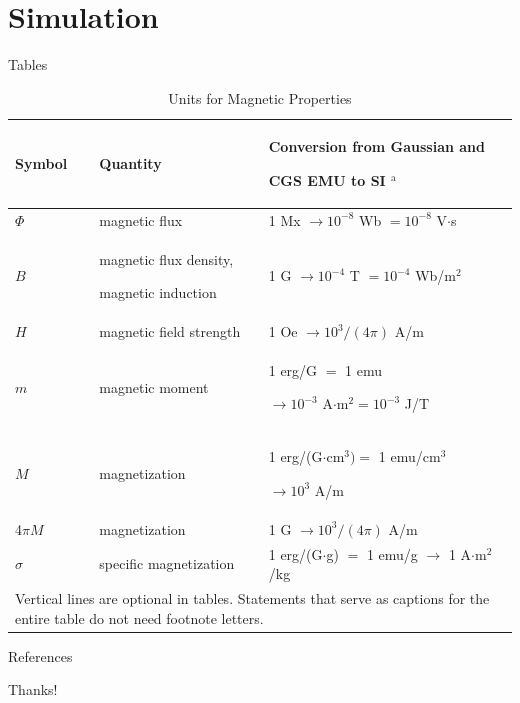 \documentclass[10pt,hyperref={colorlinks,citecolor=blue,urlcolor=peking_blue,linkcolor=}]{beamer}
\theoremstyle{plain}
\begin{document}
\section{Simulation}

\begin{frame}{Tables}
    \begin{table}
        \caption{Units for Magnetic Properties}
        \label{table}
        \setlength{\tabcolsep}{3pt}
        \begin{tabular}{p{40pt}p{100pt}p{140pt}}
        \hline
        Symbol& 
        Quantity& 
        Conversion from Gaussian and \par CGS EMU to SI $^{\mathrm{a}}$ \\
        \hline
        $\Phi $& 
        magnetic flux& 
        1 Mx $\to  10^{-8}$ Wb $= 10^{-8}$ V$\cdot $s \\
        $B$& 
        magnetic flux density, \par magnetic induction& 
        1 G $\to  10^{-4}$ T $= 10^{-4}$ Wb/m$^{2}$ \\
        $H$& 
        magnetic field strength& 
        1 Oe $\to  10^{3}/(4\pi )$ A/m \\
        $m$& 
        magnetic moment& 
        1 erg/G $=$ 1 emu \par $\to 10^{-3}$ A$\cdot $m$^{2} = 10^{-3}$ J/T \\
        $M$& 
        magnetization& 
        1 erg/(G$\cdot $cm$^{3}) =$ 1 emu/cm$^{3}$ \par $\to 10^{3}$ A/m \\
        4$\pi M$& 
        magnetization& 
        1 G $\to  10^{3}/(4\pi )$ A/m \\
        $\sigma $& 
        specific magnetization& 
        1 erg/(G$\cdot $g) $=$ 1 emu/g $\to $ 1 A$\cdot $m$^{2}$/kg \\
        \hline
        \multicolumn{3}{p{280pt}}{Vertical lines are optional in tables. Statements that serve as captions for 
        the entire table do not need footnote letters. }
        \end{tabular}
        \label{tab1}
    \end{table}
\end{frame}


\begin{frame}{References}%
    \renewcommand*{\bibfont}{\footnotesize}
    
    
\end{frame}

\begin{frame}
    \begin{center}
        {\Huge\calligra Thanks!}
    \end{center}
\end{frame}
\end{document}
